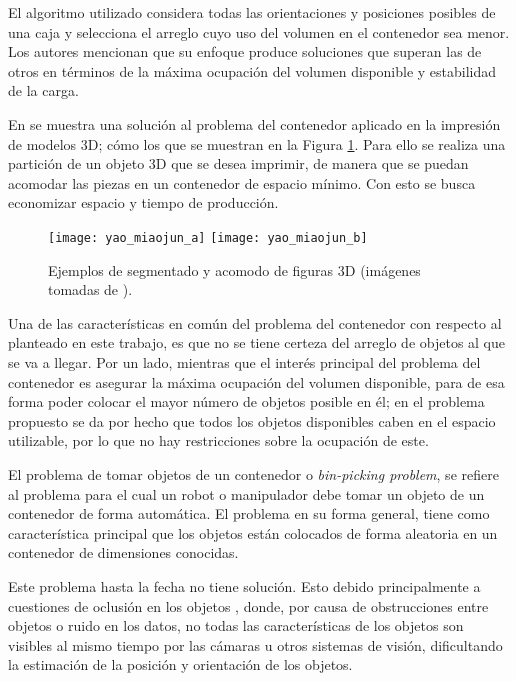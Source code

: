 El algoritmo utilizado considera todas las orientaciones y posiciones posibles de una caja y selecciona el arreglo cuyo uso del volumen en el contenedor sea menor.
Los autores mencionan que su enfoque produce soluciones que superan las de otros en términos de la máxima ocupación del volumen disponible y estabilidad de la carga.

En \cite{10.1145/2816795.2818064} se muestra una solución al problema del contenedor aplicado en la impresión de modelos 3D; cómo los que se muestran en la Figura \ref{fig:10.1145/2816795.2818064}. 
Para ello se realiza una partición de un objeto 3D que se desea imprimir, de manera que se puedan acomodar las piezas en un contenedor de espacio mínimo. 
Con esto se busca economizar espacio y tiempo de producción. 
%
\begin{figure}[H]
	\texttt{[image: yao\_miaojun\_a]}%
	\hspace{1cm}%
	\texttt{[image: yao\_miaojun\_b]}%
	\caption{Ejemplos de segmentado y acomodo de figuras 3D (imágenes tomadas de \cite{10.1145/2816795.2818064}).}%
	\label{fig:10.1145/2816795.2818064}%
\end{figure}
%
Una de las características en común del problema del contenedor con respecto al planteado en este trabajo, es que no se tiene certeza del arreglo de objetos al que se va a llegar. 
Por un lado, mientras que el interés principal del problema del contenedor es asegurar la máxima ocupación del volumen disponible, para de esa forma poder colocar el mayor número de objetos posible en él; en el problema propuesto se da por hecho que todos los objetos disponibles caben en el espacio utilizable, por lo que no hay restricciones sobre la ocupación de este.

El problema de tomar objetos de un contenedor o \textit{bin-picking problem}, se refiere al problema para el cual un robot o manipulador debe tomar un objeto de un contenedor de forma automática. 
El problema en su forma general, tiene como característica principal que los objetos están colocados de forma aleatoria en un contenedor de dimensiones conocidas.

Este problema hasta la fecha no tiene solución.
Esto debido principalmente a cuestiones de oclusión en los objetos \cite{1699272}, donde, por causa de obstrucciones entre objetos o ruido en los datos, no todas las características de los objetos son visibles al mismo tiempo por las cámaras u otros sistemas de visión, dificultando la estimación de la posición y orientación de los objetos. 

